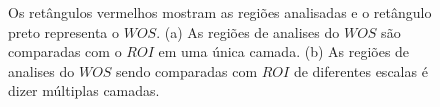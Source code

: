 \begin{figure}[H]
\centering
  \caption{Os retângulos vermelhos mostram as regiões analisadas e o retângulo preto representa o $WOS$. 
  (a) As regiões de analises do $WOS$ são comparadas com o $ROI$ em uma única camada. 
  (b) As regiões de analises do $WOS$ sendo comparadas com $ROI$ de diferentes escalas é dizer múltiplas camadas.}
  \label{fig:multires}
\end{figure}

